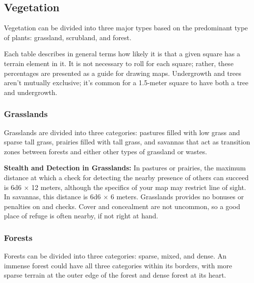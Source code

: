 \subsection{Vegetation}
Vegetation can be divided into three major types based on the predominant type of plants: grassland, scrubland, and forest.

Each table describes in general terms how likely it is that a given square has a terrain element in it. It is not necessary to roll for each square; rather, these percentages are presented as a guide for drawing maps. Undergrowth and trees aren't mutually exclusive; it's common for a 1.5-meter square to have both a tree and undergrowth.


\subsubsection{Grasslands}
Grasslands are divided into three categories: pastures filled with low grass and sparse tall grass, prairies filled with tall grass, and savannas that act as transition zones between forests and either other types of grassland or wastes.


\textbf{Stealth and Detection in Grasslands:} In pastures or prairies, the maximum distance at which a  check for detecting the nearby presence of others can succeed is 6d6 $\times$ 12 meters, although the specifics of your map may restrict line of sight. In savannas, this distance is 6d6 $\times$ 6 meters. Grasslands provides no bonuses or penalties on  and  checks. Cover and concealment are not uncommon, so a good place of refuge is often nearby, if not right at hand.


\subsubsection{Forests}
Forests can be divided into three categories: sparse, mixed, and dense. An immense forest could have all three categories within its borders, with more sparse terrain at the outer edge of the forest and dense forest at its heart.

